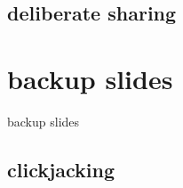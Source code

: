\subsection{deliberate sharing}


%


\section{backup slides}
\begin{frame}{backup slides}
\end{frame}





\subsection{clickjacking}



